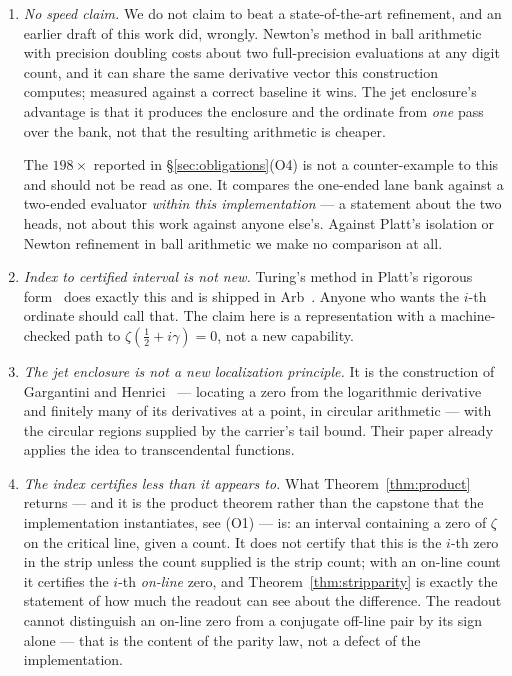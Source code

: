 \documentclass[11pt]{article}
\theoremstyle{plain}
\theoremstyle{definition}
\theoremstyle{remark}
\begin{document}
\begin{enumerate}
\item[(i)] \emph{No speed claim.} We do not claim to beat a state-of-the-art refinement,
and an earlier draft of this work did, wrongly. Newton's method in ball arithmetic with
precision doubling costs about two full-precision evaluations at any digit count, and
it can share the same derivative vector this construction computes; measured against a
correct baseline it wins. The jet enclosure's advantage is that it produces the
enclosure and the ordinate from \emph{one} pass over the bank, not that the resulting
arithmetic is cheaper.

The $198\times$ reported in \S\ref{sec:obligations}(O4) is not a counter-example to
this and should not be read as one. It compares the one-ended lane bank against a
two-ended evaluator \emph{within this implementation} --- a statement about the two
heads, not about this work against anyone else's. Against Platt's isolation or Newton
refinement in ball arithmetic we make no comparison at all.

\item[(ii)] \emph{Index to certified interval is not new.} Turing's method in Platt's
rigorous form~\cite{Platt2017} does exactly this and is shipped in
Arb~\cite{Johansson2017}. Anyone who wants the $i$-th ordinate should call that. The
claim here is a representation with a machine-checked path to
$\zeta(\tfrac12+i\gamma)=0$, not a new capability.

\item[(iii)] \emph{The jet enclosure is not a new localization principle.} It is the
construction of Gargantini and Henrici~\cite{GargantiniHenrici1971} --- locating a zero
from the logarithmic derivative and finitely many of its derivatives at a point, in
circular arithmetic --- with the circular regions supplied by the carrier's tail bound.
Their paper already applies the idea to transcendental functions.

\item[(iv)] \emph{The index certifies less than it appears to.} What
Theorem~\ref{thm:product} returns --- and it is the product theorem rather than the
capstone that the implementation instantiates, see (O1) --- is: an interval containing
a zero of $\zeta$ on the
critical line, given a count. It does not certify that this is the $i$-th zero in the
strip unless the count supplied is the strip count; with an on-line count it certifies
the $i$-th \emph{on-line} zero, and Theorem~\ref{thm:stripparity} is exactly the
statement of how much the readout can see about the difference. The readout cannot
distinguish an on-line zero from a conjugate off-line pair by its sign alone --- that
is the content of the parity law, not a defect of the implementation.


\end{enumerate}
\end{document}
